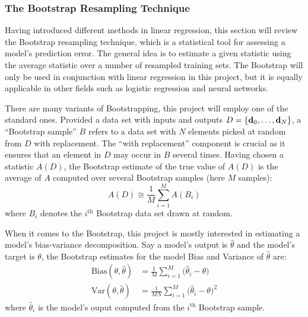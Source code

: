 \documentclass[nofootinbib,reprint,english]{revtex4-1}
\begin{document}
\subsubsection{The Bootstrap Resampling Technique}
Having introduced different methods in linear regression, this section will review the Bootstrap resampling technique, which is a statistical tool for assessing a model's prediction error. The general idea is to estimate a given statistic using the average statistic over a number of resampled training sets. The Bootstrap will only be used in conjunction with linear regression in this project, but it is equally applicable in other fields such as logistic regression and neural networks.

There are many variants of Bootstrapping, this project will employ one of the standard ones. Provided a data set with inputs and outputs \(D=\{\vb{d}_0,\ldots,\vb{d}_N\}\), a ``Bootstrap sample'' \(B\) refers to a data set with \(N\) elements picked at random from \(D\) with replacement. The ``with replacement'' component is crucial as it ensures that an element in \(D\) may occur in \(B\) several times. Having chosen a statistic \(A(D)\), the Bootstrap estimate of the true value of \(A(D)\) is the average of \(A\) computed over several Bootstrap samples (here \(M\) samples):
\begin{equation}
A(D)\cong\frac{1}{M}\sum_{i=1}^M A(B_i)
\end{equation}
where \(B_i\) denotes the \(i^\text{th}\) Bootstrap data set drawn at random.

When it comes to the Bootstrap, this project is mostly interested in estimating a model's bias-variance decomposition. Say a model's output is \(\hat{\theta}\) and the model's target is \(\theta\), the Bootstrap estimates for the model Bias and Variance of \(\hat{\theta}\) are:
\begin{subequations}
\begin{align}
\text{Bias}(\theta,\hat{\theta})&=\frac{1}{M}\sum_{i=1}^M\big(\hat{\theta}_i-\theta\big)\\
\text{Var}(\theta,\hat{\theta})&=\frac{1}{MN}\sum_{i=1}^M\big(\hat{\theta}_i-\theta\big)^2
\end{align}
\end{subequations}
where \(\hat{\theta}_i\) is the model's ouput computed from the \(i^\text{th}\) Bootstrap sample.
\end{document}
